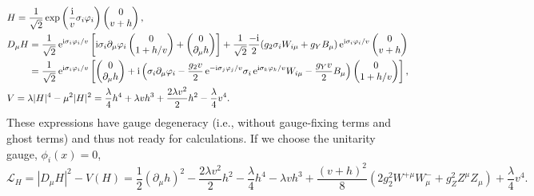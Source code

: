 \documentclass[CheatSheet]{subfiles}
\begin{document}
\begin{align}
&H=\frac1{\sqrt2}\exp\left(\frac{\mathrm{i}}{v}\sigma_i\varphi_i\right)\begin{pmatrix}0\\v+h\end{pmatrix},
\\&
 D_\mu H
= \frac1{\sqrt2}\mathop{}\!\mathrm{e}^{\mathrm{i}\sigma_i\varphi_i/v}
\left[\mathrm{i}\sigma_i\partial_\mu\varphi_i\begin{pmatrix}0\\1+h/v\end{pmatrix} + \begin{pmatrix}0\\\partial_\mu h\end{pmatrix}\right]
+\frac1{\sqrt2}\frac{-\mathrm{i}}{2}(g_2\sigma_i W_{i\mu}+g_Y B_\mu)
\mathop{}\!\mathrm{e}^{\mathrm{i}\sigma_i\varphi_i/v}\begin{pmatrix}0\\v+h\end{pmatrix}
\\&\phantom{D_\mu H}
= \frac1{\sqrt2}\mathop{}\!\mathrm{e}^{\mathrm{i}\sigma_i\varphi_i/v}
\left[
\begin{pmatrix}0\\\partial_\mu h\end{pmatrix}
+
\mathrm{i}
\left(
\sigma_i\partial_\mu\varphi_i
-\frac{g_2v}{2}
\mathop{}\!\mathrm{e}^{-\mathrm{i}\sigma_j\varphi_j/v}
\sigma_i
\mathop{}\!\mathrm{e}^{\mathrm{i}\sigma_k\varphi_k/v}
W_{i\mu}-
\frac{g_Y v}{2}B_\mu
\right)
\begin{pmatrix}0\\1+h/v\end{pmatrix}\right],
\\&V=\lambda|H|^4-\mu^2|H|^2=
\frac{\lambda}{4}h^4+\lambda v h^3+\frac{2\lambda v^2}{2}h^2-\frac{\lambda}{4}v^4.
\end{align}
These expressions have gauge degeneracy (i.e., without gauge-fixing terms and  ghost terms) and thus not ready for calculations.
If we choose the unitarity gauge, $\phi_i(x)=0$,
\begin{equation}
\mathcal L_H= |D_\mu H|^2-V(H)=\frac12(\partial_\mu h)^2-\frac{2\lambda v^2}{2}h^2
-\frac{\lambda}{4}h^4-\lambda v h^3
 + \frac{(v+h)^2}{8}(2g_2^2 W^{+\mu}W^-_\mu+g_Z^2Z^\mu Z_\mu)
+\frac{\lambda}{4}v^4.
\end{equation}
\end{document}
